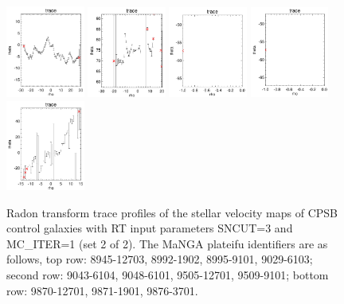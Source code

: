 \documentclass[fleqn,usenatbib]{mnras}
\begin{document}
\begin{figure}
    \includegraphics[width=0.23\textwidth]{Images/trace-plots/trace-plots-cpsb-controls/9505-12701.png}   
    \includegraphics[width=0.23\textwidth]{Images/trace-plots/trace-plots-cpsb-controls/9509-9101.png}
    \includegraphics[width=0.23\textwidth]{Images/trace-plots/trace-plots-cpsb-controls/9870-12701.png}
    \includegraphics[width=0.23\textwidth]{Images/trace-plots/trace-plots-cpsb-controls/9871-1901.png}    
    \includegraphics[width=0.23\textwidth]{Images/trace-plots/trace-plots-cpsb-controls/9876-3701.png}
    \caption{Radon transform trace profiles of the stellar velocity maps of CPSB control galaxies with RT input parameters SNCUT=3 and MC\_ITER=1 (set 2 of 2). The MaNGA plateifu identifiers are as follows, top row: 8945-12703, 8992-1902, 8995-9101, 9029-6103; second row: 9043-6104, 9048-6101, 9505-12701, 9509-9101; bottom row: 9870-12701, 9871-1901, 9876-3701.}
    \label{fig:Radon-traces-CPSB-controls-2}
\end{figure}
\end{document}
